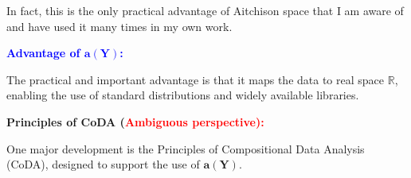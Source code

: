 \begin{frame}{}
{{In fact, this is the only practical advantage of Aitchison space that I am aware of and have used it many times in my own work.
}

\textbf{\textcolor{blue}{Advantage of \(\mathbf{a}(\mathbf{Y})\):}} 

The practical and important advantage is that it maps the data to real space $\mathbb{R}$, enabling the use of standard distributions and widely available libraries. 
    
\medskip

\textbf{Principles of CoDA (\textcolor{red}{Ambiguous perspective):}}

One major development is the Principles of Compositional Data Analysis (CoDA), designed to support the use of $\mathbf{a}(\mathbf{Y})$.
}
\end{frame}




